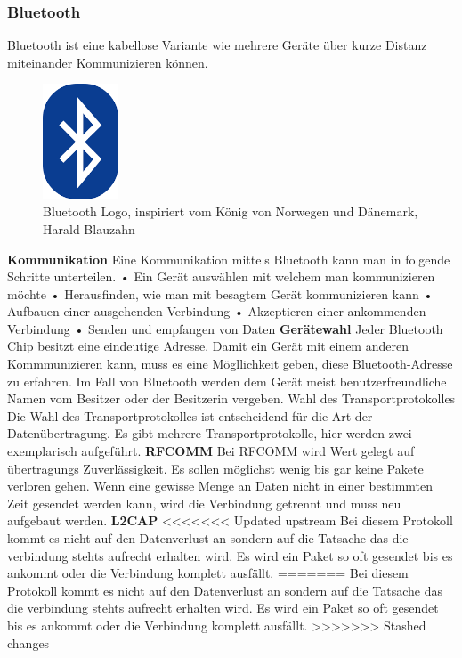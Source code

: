 \subsubsection{Bluetooth}
\label{subsec:Bluetooth}
Bluetooth ist eine kabellose Variante wie mehrere Geräte über kurze Distanz miteinander Kommunizieren können.

\begin{figure}
  \begin{center}
    \includegraphics[width=0.2\textwidth]{images/bluetooth}
  \end{center}
  \caption{Bluetooth Logo, inspiriert vom König von Norwegen und Dänemark, Harald Blauzahn \cite{PERT.CH2-bluetooth.logo}}\label{Fig:imgBluetoothLogo}
\end{figure}

\textbf{Kommunikation\newline}
Eine Kommunikation mittels Bluetooth kann man in folgende Schritte unterteilen.
\nextline
•	Ein Gerät auswählen mit welchem man kommunizieren möchte
\nextline
•	Herausfinden, wie man mit besagtem Gerät kommunizieren kann
\nextline
•	Aufbauen einer ausgehenden Verbindung
\nextline
•	Akzeptieren einer ankommenden Verbindung
\nextline
•	Senden und empfangen von Daten
\nextline
\textbf{Gerätewahl\nextline}
Jeder Bluetooth Chip besitzt eine eindeutige Adresse. Damit ein Gerät mit einem anderen Kommmunizieren kann, muss es eine Mögllichkeit geben, diese Bluetooth-Adresse zu erfahren. Im Fall von Bluetooth werden dem Gerät meist benutzerfreundliche Namen vom Besitzer oder der Besitzerin vergeben.
Wahl des Transportprotokolles
Die Wahl des Transportprotokolles ist entscheidend für die Art der Datenübertragung. Es gibt mehrere Transportprotokolle, hier werden zwei exemplarisch aufgeführt.
\nextline
\textbf{RFCOMM\nextline}
Bei RFCOMM wird Wert gelegt auf übertragungs Zuverlässigkeit. Es sollen möglichst wenig bis gar keine Pakete verloren gehen. Wenn eine gewisse Menge an Daten nicht in einer bestimmten Zeit gesendet werden kann, wird die Verbindung getrennt und muss neu aufgebaut werden.
\nextline
\textbf{L2CAP\nextline}
<<<<<<< Updated upstream
Bei diesem Protokoll kommt es nicht auf den Datenverlust an sondern auf die Tatsache das die verbindung stehts aufrecht erhalten wird. Es wird ein Paket so oft gesendet bis es ankommt oder die Verbindung komplett ausfällt.
=======
Bei diesem Protokoll kommt es nicht auf den Datenverlust an sondern auf die Tatsache das die verbindung stehts aufrecht erhalten wird. Es wird ein Paket so oft gesendet bis es ankommt oder die Verbindung komplett ausfällt.
>>>>>>> Stashed changes
